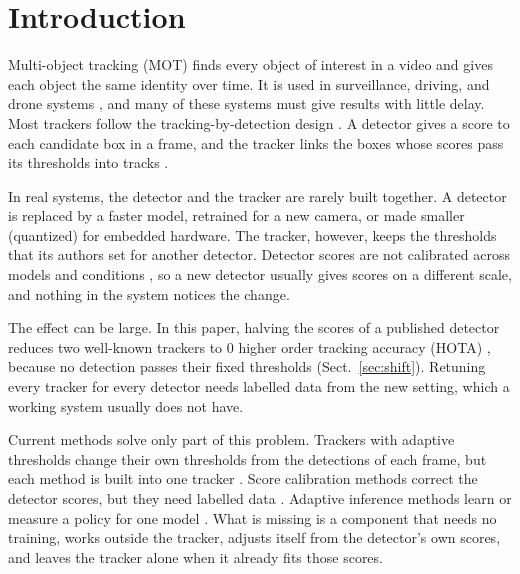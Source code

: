 \documentclass[pdflatex,referee,sn-mathphys-num]{sn-jnl}
\begin{document}
\maketitle

\section{Introduction}\label{sec:intro}

Multi-object tracking (MOT) finds every object of interest in a video and
gives each object the same identity over time. It is used in surveillance,
driving, and drone systems
\cite{zhu2022visdrone,wu2022uavsurvey}, and many of these
systems must give results with little delay. Most trackers follow the
tracking-by-detection design \cite{adzemovic2026survey}. A detector gives a score to each candidate box
in a frame, and the tracker links the boxes whose scores pass its thresholds
into tracks \cite{bewley2016sort,zhang2022bytetrack,cao2023ocsort}.

In real systems, the detector and the tracker are rarely built together. A
detector is replaced by a faster model, retrained for a new camera, or made
smaller (quantized) for embedded hardware. The tracker, however, keeps the
thresholds that its authors set for another detector. Detector scores are not
calibrated across models and conditions \cite{kuppers2020detcalib}, so a new
detector usually gives scores on a different scale, and nothing in the system
notices the change.

The effect can be large. In this paper, halving the scores of a published
detector reduces two well-known trackers to 0 higher order tracking accuracy
(HOTA) \cite{luiten2021hota}, because no detection passes their fixed
thresholds (Sect.~\ref{sec:shift}). Retuning every tracker for every detector
needs labelled data from the new setting, which a working system usually does
not have.

Current methods solve only part of this problem. Trackers with adaptive
thresholds change their own thresholds from the detections of each frame, but
each method is built into one tracker
\cite{ma2023adaptivebytetrack,shim2024adaptrack,act2026adaptive}. Score
calibration methods correct the detector scores, but they need labelled data
\cite{kuppers2020detcalib}. Adaptive inference methods learn or measure a
policy for one model \cite{han2022dynamic,jiang2018chameleon}. What is missing
is a component that needs no training, works outside the tracker, adjusts itself
from the detector's own scores, and leaves the tracker alone when it already
fits those scores.
\end{document}
